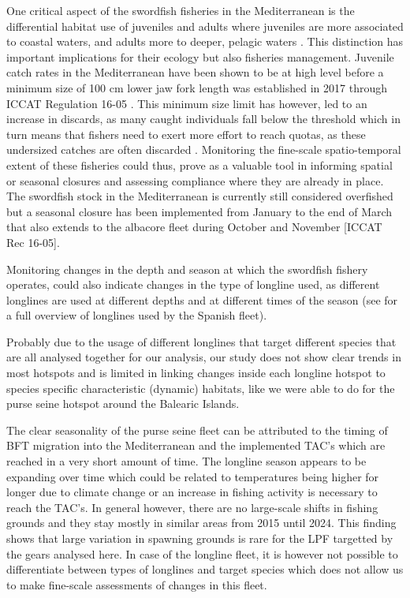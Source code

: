 One critical aspect of the swordfish fisheries in the Mediterranean is the differential habitat use
of juveniles and adults where juveniles are more associated to coastal waters, and adults more to
deeper, pelagic waters \citep{damalas_14_swo}. This distinction has important implications for
their ecology but also fisheries management. Juvenile catch rates in the Mediterranean have been
shown to be at high level before a minimum size of 100 cm lower jaw fork length was established in
2017 through ICCAT Regulation 16-05 \citep{iccat_juvenile_catches_swo,iccat_juvenile_swo_ortiz}.
This minimum size limit has however, led to an increase in discards, as many caught individuals
fall below the threshold which in turn means that fishers need to exert more effort to reach
quotas, as these undersized catches are often discarded \citep{iccat_swo_discards}. Monitoring the
fine-scale spatio-temporal extent of these fisheries could thus, prove as a valuable tool in
informing spatial or seasonal closures and assessing compliance where they are already in place.
The swordfish stock in the Mediterranean is currently still considered overfished but a seasonal
closure has been implemented from January to the end of March that also extends to the albacore
fleet during October and November [ICCAT Rec 16-05].

Monitoring changes in the depth and season at which the swordfish fishery operates, could also
indicate changes in the type of longline used, as different longlines are used at different depths
and at different times of the season (see \cite{spain_swo_gear} for a full overview of longlines
used by the Spanish fleet).

Probably due to the usage of different longlines that target different species that are all
analysed together for our analysis, our study does not show clear trends in most hotspots and is
limited in linking changes inside each longline hotspot to species specific characteristic
(dynamic) habitats, like we were able to do for the purse seine hotspot around the Balearic
Islands.

\medskip

The clear seasonality of the purse seine fleet can be attributed to the timing of BFT migration
into the Mediterranean and the implemented TAC's which are reached in a very short amount of time.
The longline season appears to be expanding over time which could be related to temperatures being
higher for longer due to climate change or an increase in fishing activity is necessary to reach
the TAC's. In general however, there are no large-scale shifts in fishing grounds and they stay
mostly in similar areas from 2015 until 2024. This finding shows that large variation in spawning
grounds is rare for the LPF targetted by the gears analysed here. In case of the longline fleet, it
is however not possible to differentiate between types of longlines and target species which does
not allow us to make fine-scale assessments of changes in this fleet.

